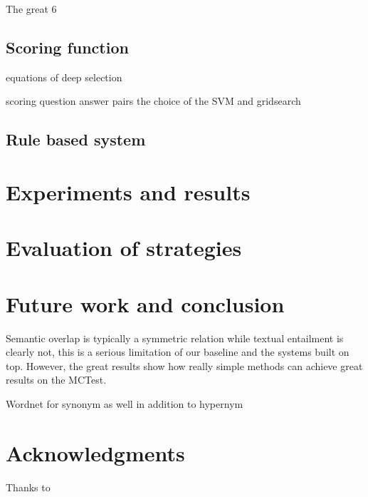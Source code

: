 \documentclass[11pt]{article}
\begin{document}
The great 6

\subsection{Scoring function}
equations of deep selection

scoring question answer pairs
the choice of the SVM and gridsearch
\label{sec:bigmix}

\subsection{Rule based system}
\label{sec:rulebased}

\section{Experiments and results}

\section{Evaluation of strategies}

\section{Future work and conclusion}

Semantic overlap is typically a symmetric relation while textual entailment is clearly not, this is a serious limitation of our baseline and the systems built on top.
However, the great results show how really simple methods can achieve great results on the MCTest.

Wordnet for synonym as well in addition to hypernym

\section*{Acknowledgments}
Thanks to



\end{document}
